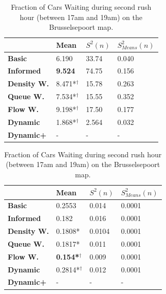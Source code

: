 \documentclass[11pt]{article}
\begin{document}
\begin{table}[h]
\centering
\caption{Average Velocity of Cars during second rush hour (between 17am and 19am) on the Brusselsepoort map.}
\label{my-label}
\begin{tabular}{l|l|l|l|}
\textbf{}                 & \textbf{Mean} & \textbf{$S^2(n)$} & \textbf{$S_{Means}^2(n)$} \\
\hline\textbf{Basic}            & 6.190          & 33.74             & 0.040                      \\
\textbf{Informed}         & \textbf{9.524} & 74.75             & 0.156                      \\
\hline\textbf{Density W.} & 8.471*$^\dagger$          & 15.78             & 0.263                      \\
\textbf{Queue W.}   & 7.534*$^\dagger$          & 15.55             & 0.352                      \\
\textbf{Flow W.}    & 9.198*$^\dagger$          & 17.50             & 0.177                      \\
\textbf{Dynamic}          & 1.868*$^\dagger$          & 2.564             & 0.032                      \\
\textbf{Dynamic+}         & -              & -                 & -                         
\end{tabular}

\centering
\caption{Fraction of Cars Waiting during second rush hour (between 17am and 19am) on the Brusselsepoort map.}
\label{my-label}
\begin{tabular}{l|l|l|l|}
\textbf{}                 & \textbf{Mean} & \textbf{$S^2(n)$} & \textbf{$S_{Means}^2(n)$} \\
\hline\textbf{Basic}      & 0.2553         & 0.014             & 0.0001                     \\
\textbf{Informed}   & 0.182          & 0.016             & 0.0001                     \\
\hline\textbf{Density W.} & 0.1808*         & 0.0104            & 0.0001                     \\
\textbf{Queue W.}   & 0.1817*         & 0.011             & 0.0001                     \\
\textbf{Flow W.}    & \textbf{0.154*$^\dagger$} & 0.009             & 0.0001                     \\
\textbf{Dynamic}    & 0.2814*$^\dagger$         & 0.012             & 0.0001                     \\
\textbf{Dynamic+}   & -              & -                 & -                         
\end{tabular}
\end{table}
\end{document}
